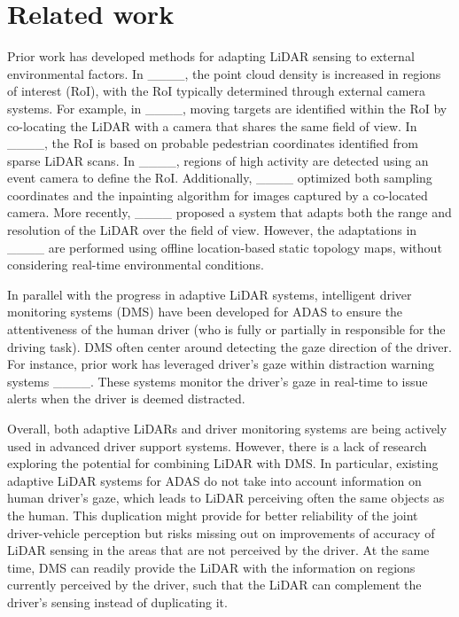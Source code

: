 \section{Related work}
Prior work has developed methods for adapting LiDAR sensing to external environmental factors. In ____, the point cloud density is increased in regions of interest (RoI), with the RoI typically determined through external camera systems. For example, in ____, moving targets are identified within the RoI by co-locating the LiDAR with a camera that shares the same field of view. In ____, the RoI is based on probable pedestrian coordinates identified from sparse LiDAR scans. In ____, regions of high activity are detected using an event camera to define the RoI. Additionally, ____ optimized both sampling coordinates and the inpainting algorithm for images captured by a co-located camera. More recently, ____ proposed a system that adapts both the range and resolution of the LiDAR over the field of view. However, the adaptations in ____ are performed using offline location-based static topology maps, without considering real-time environmental conditions.

In parallel with the progress in adaptive LiDAR systems, intelligent driver monitoring systems (DMS) have been developed for ADAS to ensure the attentiveness of the human driver (who is fully or partially in responsible for the driving task). DMS often center around detecting the gaze direction of the driver. For instance, prior work has leveraged driver’s gaze within distraction warning systems ____. These systems monitor the driver’s gaze in real-time to issue alerts when the driver is deemed distracted. 

Overall, both adaptive LiDARs and driver monitoring systems are being actively used in advanced driver support systems. However, there is a lack of research exploring the potential for combining LiDAR with DMS. In particular, existing adaptive LiDAR systems for ADAS do not take into account information on human driver's gaze, which leads to LiDAR perceiving often the same objects as the human. This duplication might provide for better reliability of the joint driver-vehicle perception but risks missing out on improvements of accuracy of LiDAR sensing in the areas that are not  perceived by the driver. At the same time, DMS can readily provide the LiDAR with the information on regions currently perceived by the driver, such that the LiDAR can complement the driver's sensing instead of duplicating it.